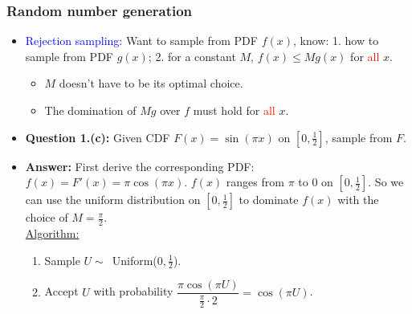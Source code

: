 \documentclass[9pt]{beamer}
\newcommand{\tblue}[1]{\textcolor{blue}{#1}}
\newcommand{\tred}[1]{\textcolor{red}{#1}}
\begin{document}
\begin{frame}
	\frametitle{Random number generation}
	\begin{itemize}
		\item \tblue{Rejection sampling:} Want to sample from PDF $f(x)$, know: 1. how to sample from PDF $g(x)$; 2. for a constant $M$, $f(x)\leq Mg(x)$ for \tred{all} $x$.
		\begin{itemize}
			\item $M$ doesn't have to be its optimal choice.
			\item The domination of $Mg$ over $f$ must hold for \tred{all} $x$.
		\end{itemize}
		\item {\bf Question 1.(c):} Given CDF $F(x)=\sin(\pi x)$ on $\left[0, \frac{1}{2}\right]$, sample from $F$.
		\item {\bf Answer:} First derive the corresponding PDF: $f(x)=F'(x)=\pi\cos(\pi x)$. $f(x)$ ranges from $\pi$ to $0$ on $\left[0, \frac{1}{2}\right]$. So we can use the uniform distribution on $\left[0, \frac{1}{2}\right]$ to dominate $f(x)$ with the choice of $M=\frac{\pi}{2}$.\\\bigskip
		\underline{Algorithm:}
		\begin{enumerate}
			\item Sample $U\sim$~Uniform($0, \frac{1}{2}$).
			\item Accept $U$ with probability $\dfrac{\pi\cos(\pi U)}{\frac{\pi}{2}\cdot 2}=\cos(\pi U)$.
		\end{enumerate}
	\end{itemize}
\end{frame}
\end{document}
